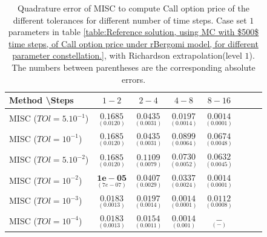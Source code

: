\documentclass[11pt]{article}
\begin{document}
\begin{table}[!h]
	\centering
	\begin{tabular}{l*{6}{c}r}
		Method \textbackslash  Steps            & $1-2$ & $2-4$ & $4-8$ & $8-16$  \\
		\hline
		MISC ($TOl=5.10^{-1}$)  & $\underset{(  0.0120)}{\mathbf{   0.1685}}$ & $\underset{(0.0031)}{\mathbf{0.0435}}$ & $\underset{(0.0014
			)}{\mathbf{ 0.0197}}$ & $\underset{(0.0001)}{\mathbf{0.0014}}$ \\
		MISC ($TOl=10^{-1}$)  & $\underset{(  0.0120)}{\mathbf{   0.1685}}$ & $\underset{(0.0031)}{\mathbf{0.0435}}$ & $\underset{(0.0064)}{\mathbf{0.0899}}$ & $\underset{(0.0048)}{\mathbf{0.0674}}$  \\
		MISC ($TOl=5.10^{-2}$)  & $\underset{(  0.0120)}{\mathbf{   0.1685}}$ & $\underset{(0.0079)}{\mathbf{0.1109}}$ & $\underset{(0.0052)}{\mathbf{0.0730}}$ & $\underset{(0.0045)}{\mathbf{0.0632}}$  \\
		MISC ($TOl=10^{-2}$)  & $\underset{(7e-07)}{\mathbf{1e-05}}$ &    $\underset{(0.0029)}{\mathbf{0.0407}}$ & $\underset{(0.0024  )}{\mathbf{0.0337}}$ & $\underset{(0.0001)}{\mathbf{0.0014}}$  \\
		MISC ($TOl=10^{-3}$)  & $\underset{(0.0013)}{\mathbf{
				0.0183}}$ &    $\underset{(0.0014
			)}{\mathbf{0.0197}}$ & $\underset{(0.0001)}{\mathbf{ 0.0014
		}}$ & $\underset{(0.0008)}{\mathbf{0.0112}}$  \\
		
		MISC ($TOl=10^{-4}$)  & $\underset{(0.0013)}{\mathbf{
				0.0183}}$ &    $\underset{(0.0011
			
			)}{\mathbf{0.0154}}$ & $\underset{(0.001)}{\mathbf{   0.0014
		}}$ & $\underset{(-)}{\mathbf{-}}$  \\
		\hline
	\end{tabular}
	\caption{Quadrature error of MISC to compute Call option price of the different tolerances for different number of time steps. Case set $1$ parameters in table \ref{table:Reference solution, using MC with $500$ time steps, of Call option price under rBergomi model, for different parameter constellation.}, with Richardson extrapolation(level $1$). The numbers between parentheses are the corresponding absolute errors.}
	\label{Quadrature error of MISC to compute Call option price of the different tolerances for different number of time steps. Case set $1$ parameters, with Richardson extrapolation(level $1$). The numbers between parentheses are the corresponding absolute errors.}
\end{table}
\end{document}
